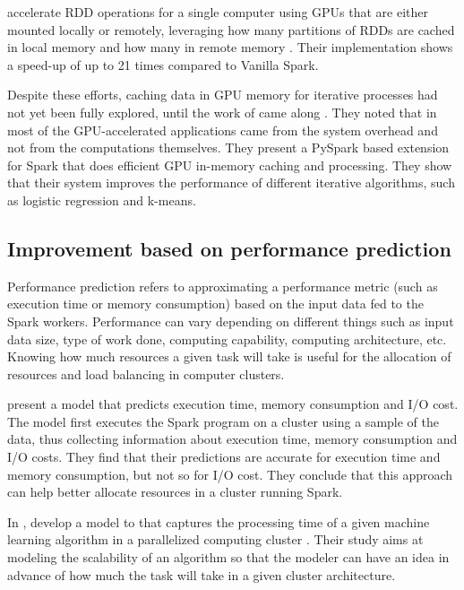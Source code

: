 \documentclass{article}
\begin{document}
\citeauthor{Ohno2017} accelerate RDD operations for a single computer using GPUs that are either mounted locally or remotely, leveraging how many partitions of RDDs are cached in local memory and how many in remote memory \cite{Ohno2017}. Their implementation shows a speed-up of up to 21 times compared to Vanilla Spark.

Despite these efforts, caching data in GPU memory for iterative processes had not yet been fully explored, until the work of \citeauthor{Hong2017} came along \cite{Hong2017}. They noted that in most of the GPU-accelerated applications came from the system overhead and not from the computations themselves. They present a PySpark based extension for Spark that does efficient GPU in-memory caching and processing. They show that their system improves the performance of different iterative algorithms, such as logistic regression and k-means.


\subsection{Improvement based on performance prediction}

Performance prediction refers to approximating a performance metric (such as execution time or memory consumption) based on the input data fed to the Spark workers. Performance can vary depending on different things such as input data size, type of work done, computing capability, computing architecture, etc. Knowing how much resources a given task will take is useful for the allocation of resources and load balancing in computer clusters.

\citeauthor{wang2015performance} \cite{wang2015performance} present a model that predicts execution time, memory consumption and I/O cost. The model first executes the Spark program on a cluster using a sample of the data, thus collecting information about execution time, memory consumption and I/O costs. They find that their predictions are accurate for execution time and memory consumption, but not so for I/O cost. They conclude that this approach can help better allocate resources in a cluster running Spark.

In \citeyear{Ulanov2017}, \citeauthor{Ulanov2017} develop a model to that captures the processing time of a given machine learning algorithm in a parallelized computing cluster \cite{Ulanov2017}. Their study aims at modeling the scalability of an algorithm so that the modeler can have an idea in advance of how much the task will take in a given cluster architecture.
\end{document}
